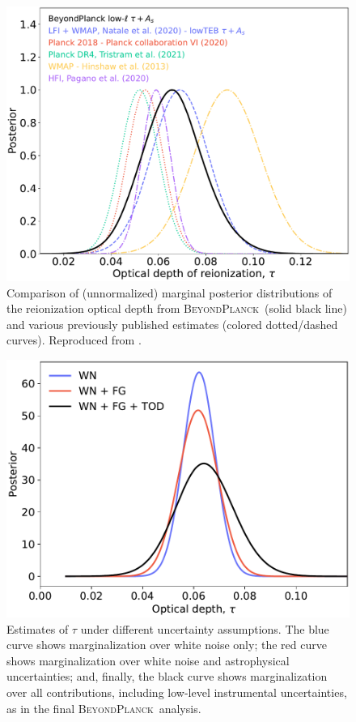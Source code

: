 \documentclass[twocolumn]{aa}
\newcommand{\BP}{\textsc{BeyondPlanck}}
\begin{document}
\begin{figure}[t]
  \center
  \includegraphics[width=\linewidth]{figs/BP10_tau_post.pdf}
  \caption{Comparison of (unnormalized) marginal
    posterior distributions of the reionization optical depth from
    \BP\ (solid black line) and various previously published estimates
    (colored dotted/dashed curves). Reproduced from \citet{bp12}.}\label{fig:tau}
\end{figure}


\begin{figure}[t]
	\center
	\includegraphics[width=\linewidth]{figs/BP10_tau_syst_assess.pdf}
        \caption{Estimates of $\tau$ under different uncertainty
          assumptions. The blue curve shows marginalization over white
          noise only; the red 
          curve shows marginalization over white noise and
          astrophysical uncertainties; and, finally, the black curve
          shows marginalization over all contributions, including
          low-level instrumental uncertainties, as in the
          final \BP\ analysis.}
	\label{fig:tau_assess}
\end{figure}
\end{document}
